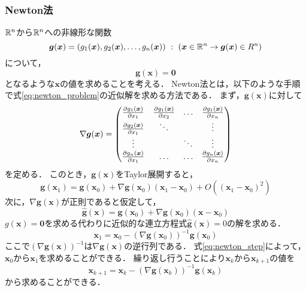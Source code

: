 \subsubsection{Newton法}
$\mathbb{R}^n$から$\mathbb{R}^n$への非線形な関数
\begin{equation}
    \bm{g}(\bm{x}) = \left(g_1(\bm{x}), g_2(\bm{x}), \dots, g_n(\bm{x})\right) \ : \ (\bm{x} \in \mathbb{R}^n \rightarrow \bm{g}(\bm{x}) \in R^n)
\end{equation}
について，
\begin{equation}
    \label{eq:newton_problem}
    \bm{g}(\bm{x}) = \bm{0}
\end{equation}
となるような$\bm{x}$の値を求めることを考える．
Newton法とは，以下のような手順で式\eqref{eq:newton_problem}の近似解を求める方法である．
まず，$\bm{g}(\bm{x})$に対して
\begin{equation*}
    \nabla\bm{g}(\bm{x}) = \begin{pmatrix}
        \frac{\partial g_1(\bm{x})}{\partial x_1} & \frac{\partial g_1(\bm{x})}{\partial x_2} & \dots & \frac{\partial g_1(\bm{x})}{\partial x_n} \\
        \frac{\partial g_2(\bm{x})}{\partial x_1} & \ddots & & \vdots \\
        \vdots & & \ddots & \vdots\\
        \frac{\partial g_n(\bm{x})}{\partial x_1} & \dots & \dots & \frac{\partial g_n(\bm{x})}{\partial x_n}
    \end{pmatrix}
\end{equation*}
を定める．
このとき，$\bm{g}(\bm{x})$をTaylor展開すると，
\begin{equation*}
    \bm{g}(\bm{x}_1) = \bm{g}(\bm{x}_0) + \nabla\bm{g}(\bm{x}_0)(\bm{x}_1- \bm{x}_0) + O\left((\bm{x}_1 - \bm{x}_0)^2\right)
\end{equation*}
次に，$\nabla\bm{g}(\bm{x})$が正則であると仮定して，
\begin{equation*}
    \hat{\bm{g}}(\bm{x}) = \bm{g}(\bm{x}_0) + \nabla\bm{g}(\bm{x}_0)(\bm{x}- \bm{x}_0)
\end{equation*}
$g(\bm{x})=\bm{0}$を求める代わりに近似的な連立方程式$\hat{\bm{g}}(\bm{x})=0$の解を求める．
\begin{equation}
    \label{eq:newton_step}
    \bm{x}_1 = \bm{x}_0 - \left(\nabla\bm{g}(\bm{x}_0)\right)^{-1}\bm{g}(\bm{x}_0)
\end{equation}
ここで$\left(\nabla\bm{g}(\bm{x})\right)^{-1}$は$\nabla\bm{g}(\bm{x})$の逆行列である．
式\eqref{eq:newton_step}によって，$\bm{x}_0$から$\bm{x}_1$を求めることができる．
繰り返し行うことにより$\bm{x}_k$から$\bm{x}_{k+1}$の値を
\begin{equation*}
    \bm{x}_{k+1} = \bm{x}_k - \left(\nabla\bm{g}(\bm{x}_k)\right)^{-1}\bm{g}(\bm{x}_k)
\end{equation*}
から求めることができる．